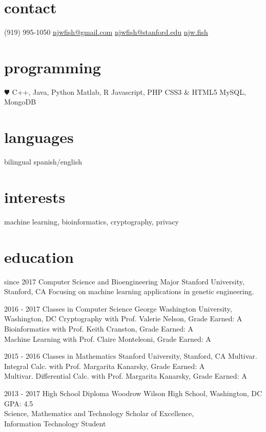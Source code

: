 \documentclass[]{cv}
\begin{document}
\thispagestyle{empty}
       {}


\begin{aside}
  \section{contact}
    (919) 995-1050
    \href{mailto:njwfish@gmail.com}{njwfish@gmail.com}
    \href{mailto:njwfish@stanford.edu}{njwfish@stanford.edu}
    \href{http://njw.fish}{njw.fish}
  \section{programming}
    {\color{red} $\varheartsuit$} C++, Java, Python
    Matlab, R
    Javascript, PHP
    CSS3 \& HTML5
    MySQL, MongoDB
  \section{languages}
    bilingual spanish/english
\end{aside}

\section{interests}

machine learning, bioinformatics, cryptography, privacy

\section{education}

\begin{entrylist}
  \entry
    {since 2017}
    {Computer Science and Bioengineering Major}
    {Stanford University, Stanford, CA}
    {Focusing on machine learning applications in genetic engineering.}

  \entry
    {2016 - 2017}
    {Classes in Computer Science}
    {George Washington University, Washington, DC}
    {Cryptography with Prof. Valerie Nelson, Grade Earned: A\\
     Bioinformatics with Prof. Keith Cranston, Grade Earned: A\\
     Machine Learning with Prof. Claire Monteleoni, Grade Earned: A}
     
  \entry
    {2015 - 2016}
    {Classes in Mathematics}
    {Stanford University, Stanford, CA}
    {Multivar. Integral Calc. with Prof. Margarita Kanarsky, Grade Earned: A\\
     Multivar. Differential Calc. with Prof. Margarita Kanarsky, Grade Earned: A}
    
  \entry
    {2013 - 2017}
    {High School Diploma}
    {Woodrow Wilson High School, Washington, DC}
    {GPA: 4.5 \\
    Science, Mathematics and Technology Scholar of Excellence, \\Information Technology Student}

\end{entrylist}
\end{document}
